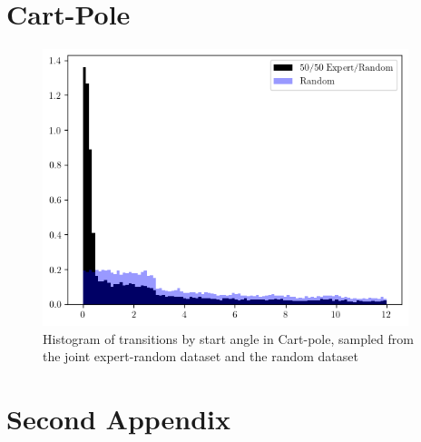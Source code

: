 \documentclass[mlabstract]{jmlr}
\begin{document}
\section{Cart-Pole}
\begin{figure}[H]
	\centering
	\includegraphics[width=0.95\textwidth]{Figures/angles_cp.png}
	\caption{Histogram of transitions by start angle in Cart-pole, sampled from the joint expert-random dataset and the random dataset}\label{fig:cp_hist}
\end{figure}



\section{Second Appendix}\label{apd:second}
\end{document}

